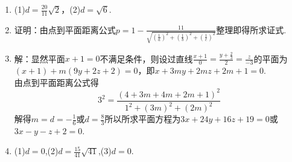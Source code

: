 \documentclass[UTF8]{ctexart}
\begin{document}
\begin{enumerate}

\item (1)$d=\displaystyle\frac{20}{11}\sqrt{2}$，(2)$d=\sqrt{6}$.

\item 证明：由点到平面距离公式$p=1-\displaystyle\frac{11}{\sqrt{\left(\displaystyle\frac{1}{a}\right)^2+\left(\displaystyle\frac{1}{b}\right)^2+\left(\displaystyle\frac{1}{c}\right)^2}}$整理即得所求证式.

\item 解：显然平面$x+1=0$不满足条件，则设过直线$\displaystyle\frac{x+1}{0}=\displaystyle\frac{y+\frac{2}{3}}{2}=\displaystyle\frac{z}{-3}$的平面为$\left(x+1\right)+m\left(9y+2z+2\right)=0$，即$x+3my+2mz+2m+1=0$.\\
由点到平面距离公式得$$3^2=\displaystyle\frac{\left(4+3m+4m+2m+1\right)^2}{1^2+\left(3m\right)^2+\left(2m\right)^2}$$解得$m=d=\displaystyle-\frac{1}{6}$或$d=\displaystyle\frac{8}{3}$所以所求平面方程为$3x+24y+16z+19=0$或$3x-y-z+2=0$.

\item (1)$d=0$,(2)$d=\displaystyle\frac{15}{41}\sqrt{41}$,(3)$d=0$.


\end{enumerate}
\end{document}
